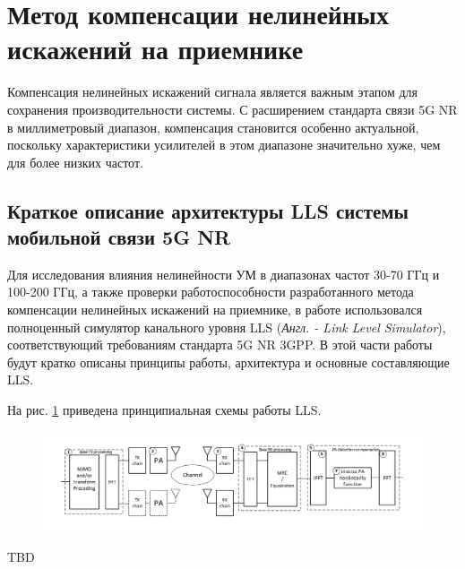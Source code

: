 \section{Метод компенсации нелинейных искажений на приемнике}
Компенсация нелинейных искажений сигнала является важным этапом для
сохранения производительности системы. С расширением стандарта связи 5G NR
в миллиметровый диапазон, компенсация становится особенно актуальной,
поскольку характеристики усилителей в этом диапазоне значительно хуже, чем
для более низких частот.


\subsection{Краткое описание архитектуры LLS системы мобильной связи 5G NR}

Для исследования влияния нелинейности УМ в диапазонах частот 30-70 ГГц и
100-200 ГГц, а также проверки работоспособности разработанного метода
компенсации нелинейных искажений на приемнике, в работе использовался
полноценный симулятор канального уровня LLS (\textit{Англ. - Link Level
Simulator}), соответствующий требованиям стандарта 5G NR 3GPP. В этой части
работы будут кратко описаны принципы работы, архитектура и основные
составляющие LLS. 

На рис. \ref{fig:lls_scheme} приведена принципиальная схемы работы LLS.
\begin{figure}[h!]
    \centering
    \includegraphics[width=0.99\linewidth]{figs/lls_scheme.png}
    \caption{}
    \label{fig:lls_scheme}
\end{figure}

TBD

